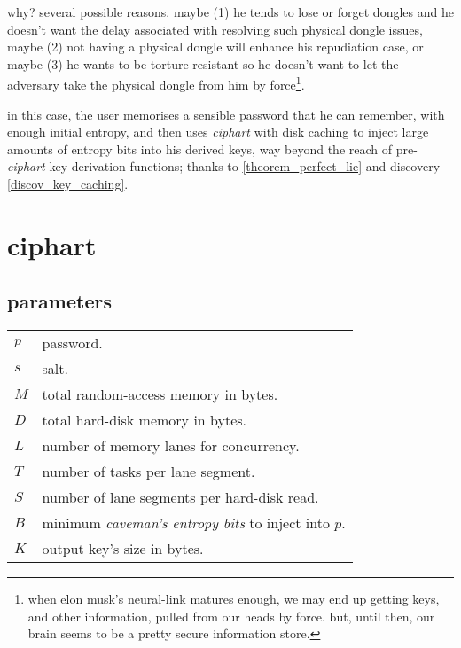 \documentclass[twocolumn]{article}
\begin{document}
why?  several possible reasons.  maybe (1) he tends to lose or forget
dongles and he doesn't want the delay associated with resolving such
physical dongle issues, maybe (2) not having a physical dongle will enhance
his repudiation case, or maybe (3) he wants to be torture-resistant so he
doesn't want to let the adversary take the physical dongle from him by
force\footnote{when elon musk's neural-link matures enough, we may end up
getting keys, and other information, pulled from our heads by force.  but,
until then, our brain seems to be a pretty secure information store.}.

in this case, the user memorises a sensible password that he can remember,
with enough initial entropy, and then uses \emph{ciphart} with disk caching
to inject large amounts of entropy bits into his derived keys, way beyond
the reach of pre-\emph{ciphart} key derivation functions; thanks to
\cref{theorem_perfect_lie} and discovery \ref{discov_key_caching}.  

\section{ciphart}
\subsection{parameters}
\begin{tabularx}{\columnwidth}{lX}
    $p$ & password.\\
    $s$ & salt.\\
    $M$ & total random-access memory in bytes.\\
    $D$ & total hard-disk memory in bytes.\\
    $L$ & number of memory lanes for concurrency.\\
    $T$ & number of tasks per lane segment.\\
    $S$ & number of lane segments per hard-disk read.\\
    $B$ & minimum \emph{caveman's entropy bits} to inject into $p$.\\
    $K$ & output key's size in bytes.\\
\end{tabularx}
\end{document}
